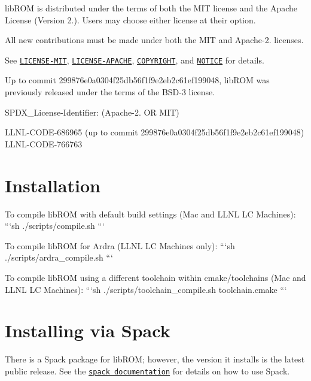 lib\-R\-O\-M is distributed under the terms of both the M\-I\-T license and the Apache License (Version 2.). Users may choose either license at their option.

All new contributions must be made under both the M\-I\-T and Apache-\/2. licenses.

See \href{https://github.com/LLNL/libROM/blob/master/LICENSE-MIT}{\tt L\-I\-C\-E\-N\-S\-E-\/\-M\-I\-T}, \href{https://github.com/LLNL/libROM/blob/master/LICENSE-APACHE}{\tt L\-I\-C\-E\-N\-S\-E-\/\-A\-P\-A\-C\-H\-E}, \href{https://github.com/LLNL/libROM/blob/master/COPYRIGHT}{\tt C\-O\-P\-Y\-R\-I\-G\-H\-T}, and \href{https://github.com/LLNL/libROM/blob/master/NOTICE}{\tt N\-O\-T\-I\-C\-E} for details.

Up to commit 299876e0a0304f25db56f1f9e2eb2c61ef199048, lib\-R\-O\-M was previously released under the terms of the B\-S\-D-\/3 license.

S\-P\-D\-X\-\_\-\-License-\/\-Identifier\-: (Apache-\/2. O\-R M\-I\-T)

L\-L\-N\-L-\/\-C\-O\-D\-E-\/686965 (up to commit 299876e0a0304f25db56f1f9e2eb2c61ef199048) L\-L\-N\-L-\/\-C\-O\-D\-E-\/766763

\section*{Installation}

To compile lib\-R\-O\-M with default build settings (Mac and L\-L\-N\-L L\-C Machines)\-: ```sh ./scripts/compile.sh ```

To compile lib\-R\-O\-M for Ardra (L\-L\-N\-L L\-C Machines only)\-: ```sh ./scripts/ardra\-\_\-compile.sh ```

To compile lib\-R\-O\-M using a different toolchain within cmake/toolchains (Mac and L\-L\-N\-L L\-C Machines)\-: ```sh ./scripts/toolchain\-\_\-compile.sh toolchain.\-cmake ```

\section*{Installing via Spack}

There is a Spack package for lib\-R\-O\-M; however, the version it installs is the latest public release. See the \href{http://spack.readthedocs.io/en/latest/index.html}{\tt spack documentation} for details on how to use Spack. 